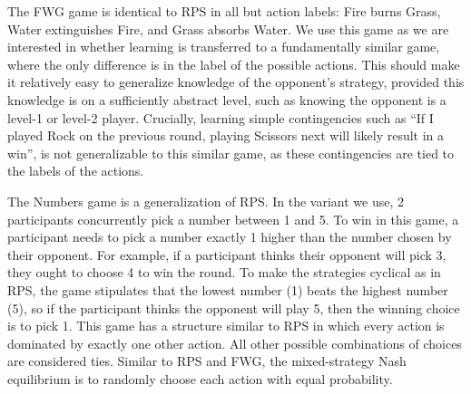 \documentclass[smallextended]{svjour3}       %
\begin{document}
The FWG game is identical to RPS in all but action labels: Fire burns
Grass, Water extinguishes Fire, and Grass absorbs Water. We use this
game as we are interested in whether learning is transferred to a
fundamentally similar game, where the only difference is in the label of
the possible actions. This should make it relatively easy to generalize
knowledge of the opponent's strategy, provided this knowledge is on a
sufficiently abstract level, such as knowing the opponent is a level-1
or level-2 player. Crucially, learning simple contingencies such as ``If
I played Rock on the previous round, playing Scissors next will likely
result in a win'', is not generalizable to this similar game, as these
contingencies are tied to the labels of the actions.

The Numbers game is a generalization of RPS. In the variant we use, 2
participants concurrently pick a number between 1 and 5. To win in this
game, a participant needs to pick a number exactly 1 higher than the
number chosen by their opponent. For example, if a participant thinks
their opponent will pick 3, they ought to choose 4 to win the round. To
make the strategies cyclical as in RPS, the game stipulates that the
lowest number (1) beats the highest number (5), so if the participant
thinks the opponent will play 5, then the winning choice is to pick 1.
This game has a structure similar to RPS in which every action is
dominated by exactly one other action. All other possible combinations
of choices are considered ties. Similar to RPS and FWG, the
mixed-strategy Nash equilibrium is to randomly choose each action with
equal probability.
\end{document}
